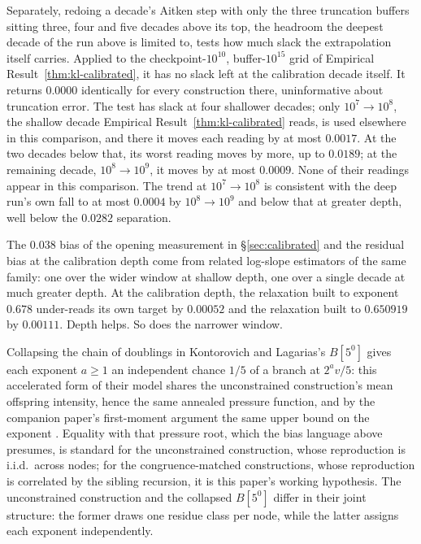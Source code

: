 \documentclass[11pt]{article}
\theoremstyle{remark}
\begin{document}
Separately, redoing a decade's Aitken step with only the three
truncation buffers sitting three, four and five decades above its top,
the headroom the deepest decade of the run above is limited to, tests
how much slack the extrapolation itself carries. Applied to the
checkpoint-$10^{10}$, buffer-$10^{15}$ grid of Empirical
Result~\ref{thm:kl-calibrated}, it has no slack left at the calibration decade
itself. It returns $0.0000$ identically for every construction there,
uninformative about truncation error. The test has slack at four
shallower decades; only $10^7\!\to\!10^8$, the shallow decade Empirical
Result~\ref{thm:kl-calibrated} reads, is used elsewhere in this
comparison, and there it moves each reading by at most $0.0017$. At
the two decades below that, its worst reading moves by more, up to
$0.0189$; at the remaining decade, $10^8\!\to\!10^9$, it moves by at
most $0.0009$. None of their readings appear in this comparison. The trend at
$10^7\!\to\!10^8$ is consistent with the deep run's own fall to at
most $0.0004$ by $10^8\!\to\!10^9$ and below that at greater depth,
well below the $0.0282$ separation.

The $0.038$ bias of the opening measurement in \S\ref{sec:calibrated}
and the residual bias at the calibration depth come from related
log-slope estimators of the same family: one over the wider window at
shallow depth, one over a single decade at much greater depth. At the
calibration depth, the relaxation built to exponent $0.678$ under-reads
its own target by $0.00052$ and the relaxation built to $0.650919$ by
$0.00111$. Depth helps. So does the narrower window.

Collapsing the chain of doublings in Kontorovich and Lagarias's
$B[5^0]$ gives each exponent $a\ge1$ an independent chance $1/5$ of a
branch at $2^av/5$: this accelerated form of their model shares the
unconstrained construction's mean offspring intensity, hence the same
annealed pressure function, and by the companion paper's first-moment
argument the same upper bound on the exponent \cite{PressureCompanion}.
Equality with that pressure root, which the bias language above
presumes, is standard for the unconstrained construction, whose
reproduction is i.i.d.\ across nodes; for the congruence-matched
constructions, whose reproduction is correlated by the sibling
recursion, it is this paper's working hypothesis. The unconstrained
construction and the collapsed $B[5^0]$ differ in their joint
structure: the former draws one residue class per node, while the
latter assigns each exponent independently.
\end{document}
